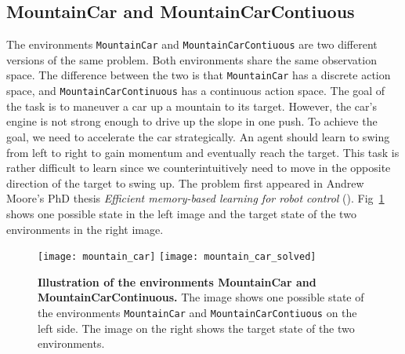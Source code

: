 \subsection{MountainCar and MountainCarContiuous}
The environments \verb|MountainCar| and \verb|MountainCarContiuous| are two different versions of the same problem. Both environments share the same observation space. The difference between the two is that \verb|MountainCar| has a discrete action space, and \verb|MountainCarContinuous| has a continuous action space. The goal of the task is to maneuver a car up a mountain to its target. However, the car's engine is not strong enough to drive up the slope in one push. To achieve the goal, we need to accelerate the car strategically. An agent should learn to swing from left to right to gain momentum and eventually reach the target. This task is rather difficult to learn since we counterintuitively need to move in the opposite direction of the target to swing up. The problem first appeared in Andrew Moore's PhD thesis \emph{Efficient memory-based learning for robot control} (\cite{moore1990efficient}). Fig~\ref{fig:mountain_car} shows one possible state in the left image and the target state of the two environments in the right image.
\begin{figure}[!ht]
  \centering
  \texttt{[image: mountain\_car]} \hspace*{10mm} \texttt{[image: mountain\_car\_solved]}
\caption[Illustration of the environment MountainCar]{
  \textbf{Illustration of the environments MountainCar and MountainCarContinuous.}
  The image shows one possible state of the environments \texttt{MountainCar} and \texttt{MountainCarContiuous} on the left side. The image on the right shows the target state of the two environments.
}
\label{fig:mountain_car}
\end{figure}

